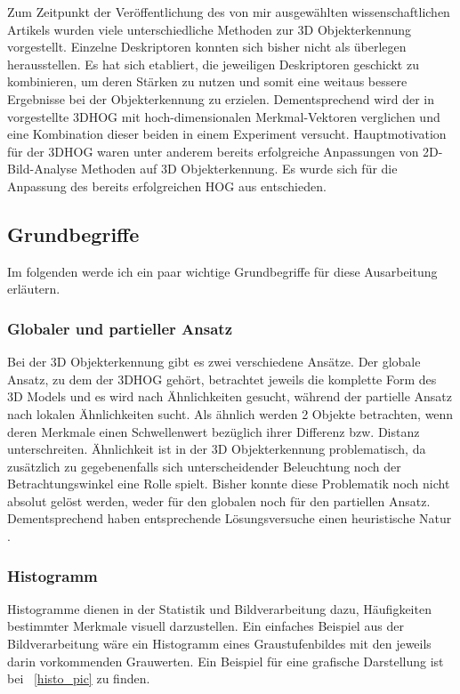 Zum Zeitpunkt der Veröffentlichung des von mir ausgewählten wissenschaftlichen Artikels wurden viele
unterschiedliche Methoden zur 3D Objekterkennung vorgestellt. Einzelne Deskriptoren konnten sich 
bisher nicht als überlegen herausstellen. Es hat sich etabliert, die jeweiligen Deskriptoren
geschickt zu kombinieren, um deren Stärken zu nutzen und somit eine weitaus bessere Ergebnisse bei der Objekterkennung zu erzielen.
Dementsprechend wird der in \cite{scherer2010histograms} vorgestellte 3DHOG mit hoch-dimensionalen Merkmal-Vektoren
verglichen und eine Kombination dieser beiden in einem Experiment versucht.
\newline
Hauptmotivation für der 3DHOG waren unter anderem bereits erfolgreiche Anpassungen von 2D-Bild-Analyse Methoden auf 3D Objekterkennung. Es wurde sich für die Anpassung des bereits erfolgreichen HOG aus \cite{dalal2005histograms} entschieden.


\subsection{Grundbegriffe}
Im folgenden werde ich ein paar wichtige Grundbegriffe für diese Ausarbeitung erläutern. 

\subsubsection{Globaler und partieller Ansatz}
Bei der 3D Objekterkennung gibt es zwei verschiedene Ansätze. Der globale Ansatz, zu dem der 3DHOG gehört, betrachtet jeweils die komplette Form des 3D Models und es wird nach Ähnlichkeiten gesucht, während der partielle Ansatz nach lokalen Ähnlichkeiten sucht. Als ähnlich werden 2 Objekte betrachten, wenn deren Merkmale einen Schwellenwert bezüglich ihrer Differenz bzw. Distanz unterschreiten. Ähnlichkeit ist in der 3D Objekterkennung problematisch, da zusätzlich zu gegebenenfalls sich unterscheidender Beleuchtung noch der Betrachtungswinkel eine Rolle spielt. Bisher konnte diese Problematik noch nicht absolut gelöst werden, weder für den globalen noch für den partiellen Ansatz. Dementsprechend haben entsprechende Lösungsversuche einen heuristische Natur \cite{scherer2010histograms}.

\subsubsection{Histogramm}
Histogramme dienen in der Statistik und Bildverarbeitung dazu, Häufigkeiten bestimmter Merkmale visuell darzustellen. Ein einfaches Beispiel aus der Bildverarbeitung wäre ein Histogramm eines
Graustufenbildes mit den jeweils darin vorkommenden Grauwerten. Ein Beispiel für eine grafische Darstellung ist bei \figurename~\ref{histo_pic} zu finden.

